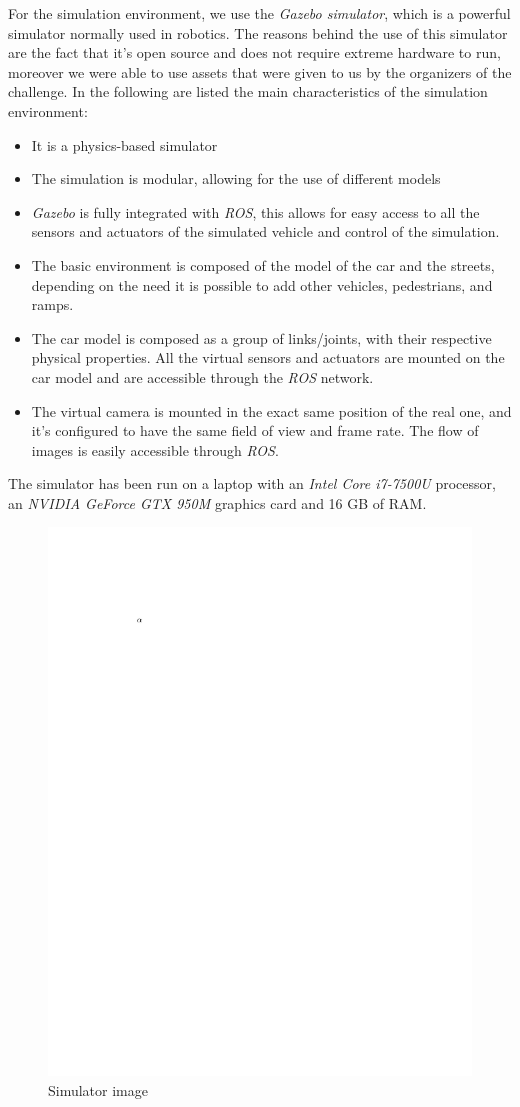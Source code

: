 \documentclass[a4paper,12pt,sort&compress]{article}
\begin{document}
    For the simulation environment, we use the \textit{Gazebo
    simulator}\citep*{1389727}, which is a powerful simulator normally used in
    robotics. The reasons behind the use of this simulator are the fact that
    it's open source and does not require extreme hardware to run, moreover we
    were able to use assets that were given to us by the organizers of the
    challenge. In the following are listed the main characteristics of the
    simulation environment:
    \begin{itemize}
        \item It is a physics-based simulator
        \item The simulation is modular, allowing for the use of different
        models 
        \item \textit{Gazebo} is fully integrated with \textit{ROS}, this allows
        for easy access to all the sensors and actuators of the simulated
        vehicle and control of the simulation.
        \item The basic environment is composed of the model of the car and the
        streets, depending on the need it is possible to add other vehicles,
        pedestrians, and ramps.
        \item The car model is composed as a group of links/joints, with their
        respective physical properties. All the virtual sensors and actuators are
        mounted on the car model and are accessible through the \textit{ROS} network.
        \item The virtual camera is mounted in the exact same position of the
        real one, and it's configured to have the same field of view and frame
        rate. The flow of images is easily accessible through \textit{ROS}.
    \end{itemize}

    The simulator has been run on a laptop with an \textit{Intel Core i7-7500U}
    processor, an \textit{NVIDIA GeForce GTX 950M} graphics card and 16 GB of
    RAM.
    

    \begin{figure}
        \centering
        \includegraphics[width=0.6\linewidth]{a.pdf}
        \caption{ Simulator image }
        \label{fig:simulator}
    \end{figure}
\end{document}
